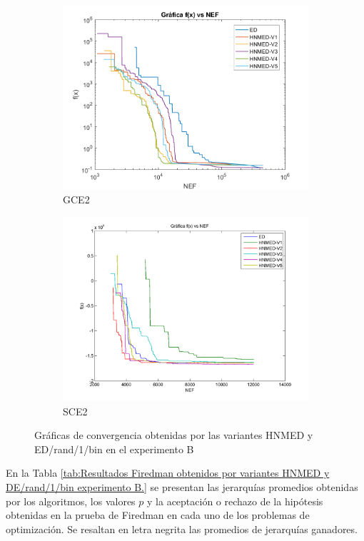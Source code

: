 \begin{figure}
\begin{subfigure}[b]{0.49\linewidth}
		\includegraphics[width=\linewidth]{Figures/Grafica_Convergencia_Problema_5}
		\caption{GCE2} \label{fig:G2} 
	\end{subfigure}
	\begin{subfigure}[b]{0.49\linewidth}
		\includegraphics[width=\linewidth]{Figures/Grafica_Convergencia_Problema_6}
		\caption{SCE2} \label{fig:S1} 
	\end{subfigure}
	\caption{Gráficas de convergencia obtenidas por las variantes HNMED y ED/rand/1/bin en el experimento B} \label{fig: Gráficas de convergencia para las variantes HNMED y ED/rand/1/bin} 
	
\end{figure}
En la Tabla \ref{tab:Resultados Firedman obtenidos por variantes HNMED y DE/rand/1/bin  experimento B.} se presentan las jerarquías promedios obtenidas por los algoritmos, los valores $p$ y la aceptación o rechazo de la hipótesis obtenidas en la prueba de Firedman en cada uno de los problemas de optimización. Se resaltan en letra negrita las promedios de jerarquías ganadores.

